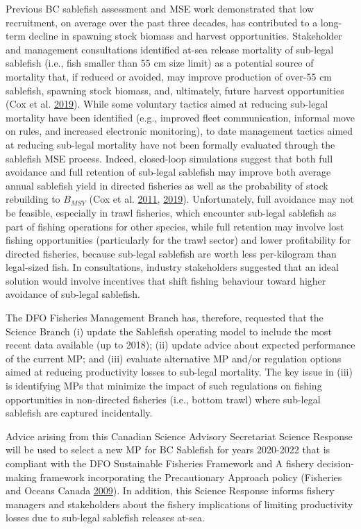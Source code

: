 \documentclass[11pt]{book}
\begin{document}
Previous BC sablefish assessment and MSE work demonstrated that low recruitment, on average over the past three decades, has contributed to a long-term decline in spawning stock biomass and harvest opportunities. Stakeholder and management consultations identified at-sea release mortality of sub-legal sablefish (i.e., fish smaller than 55 cm size limit) as a potential source of mortality that, if reduced or avoided, may improve production of over-55 cm sablefish, spawning stock biomass, and, ultimately, future harvest opportunities (Cox et al. \protect\hyperlink{ref-cox2019evaluating}{2019}). While some voluntary tactics aimed at reducing sub-legal mortality have been identified (e.g., improved fleet communication, informal move on rules, and increased electronic monitoring), to date management tactics aimed at reducing sub-legal mortality have not been formally evaluated through the sablefish MSE process. Indeed, closed-loop simulations suggest that both full avoidance and full retention of sub-legal sablefish may improve both average annual sablefish yield in directed fisheries as well as the probability of stock rebuilding to \(B_{MSY}\) (Cox et al. \protect\hyperlink{ref-cox2011management}{2011}, \protect\hyperlink{ref-cox2019evaluating}{2019}). Unfortunately, full avoidance may not be feasible, especially in trawl fisheries, which encounter sub-legal sablefish as part of fishing operations for other species, while full retention may involve lost fishing opportunities (particularly for the trawl sector) and lower profitability for directed fisheries, because sub-legal sablefish are worth less per-kilogram than legal-sized fish. In consultations, industry stakeholders suggested that an ideal solution would involve incentives that shift fishing behaviour toward higher avoidance of sub-legal sablefish.

The DFO Fisheries Management Branch has, therefore, requested that the Science Branch (i) update the Sablefish operating model to include the most recent data available (up to 2018); (ii) update advice about expected performance of the current MP; and (iii) evaluate alternative MP and/or regulation options aimed at reducing productivity losses to sub-legal mortality. The key issue in (iii) is identifying MPs that minimize the impact of such regulations on fishing opportunities in non-directed fisheries (i.e., bottom trawl) where sub-legal sablefish are captured incidentally.

Advice arising from this Canadian Science Advisory Secretariat Science Response will be used to select a new MP for BC Sablefish for years 2020-2022 that is compliant with the DFO Sustainable Fisheries Framework and A fishery decision-making framework incorporating the Precautionary Approach policy (Fisheries and Oceans Canada \protect\hyperlink{ref-DFO2009}{2009}). In addition, this Science Response informs fishery managers and stakeholders about the fishery implications of limiting productivity losses due to sub-legal sablefish releases at-sea.
\end{document}
